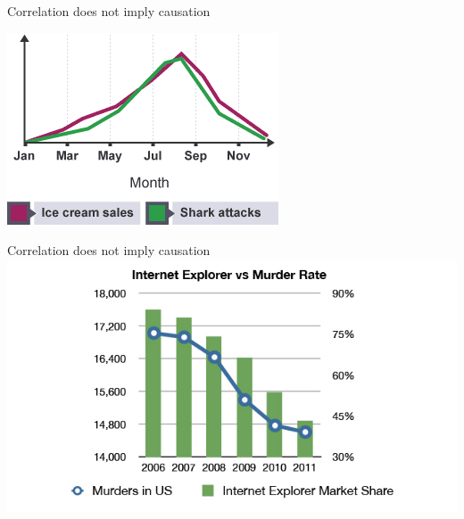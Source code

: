 \begin{frame}{Correlation does not imply causation}
	\pause
	\begin{center}
		\includegraphics[height=0.5\textheight]{shark_attacks}
	\end{center}
\end{frame}

\begin{frame}{Correlation does not imply causation}
	\includegraphics[width=\textwidth]{internet_explorer_murder_rate}
\end{frame}
